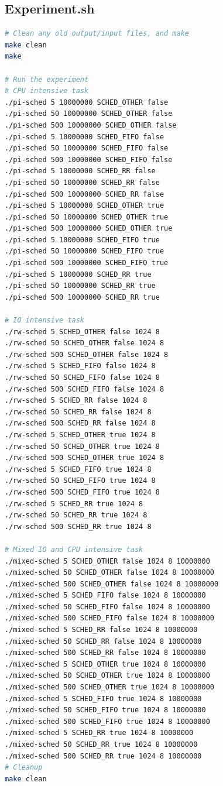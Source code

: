 \documentclass{article}
\begin{document}
\subsection{Experiment.sh}
\begin{lstlisting}[language=bash]
# Clean any old output/input files, and make
make clean
make

# Run the experiment
# CPU intensive task
./pi-sched 5 10000000 SCHED_OTHER false
./pi-sched 50 10000000 SCHED_OTHER false
./pi-sched 500 10000000 SCHED_OTHER false
./pi-sched 5 10000000 SCHED_FIFO false
./pi-sched 50 10000000 SCHED_FIFO false
./pi-sched 500 10000000 SCHED_FIFO false
./pi-sched 5 10000000 SCHED_RR false
./pi-sched 50 10000000 SCHED_RR false
./pi-sched 500 10000000 SCHED_RR false
./pi-sched 5 10000000 SCHED_OTHER true
./pi-sched 50 10000000 SCHED_OTHER true
./pi-sched 500 10000000 SCHED_OTHER true
./pi-sched 5 10000000 SCHED_FIFO true
./pi-sched 50 10000000 SCHED_FIFO true
./pi-sched 500 10000000 SCHED_FIFO true
./pi-sched 5 10000000 SCHED_RR true
./pi-sched 50 10000000 SCHED_RR true
./pi-sched 500 10000000 SCHED_RR true

# IO intensive task
./rw-sched 5 SCHED_OTHER false 1024 8
./rw-sched 50 SCHED_OTHER false 1024 8
./rw-sched 500 SCHED_OTHER false 1024 8
./rw-sched 5 SCHED_FIFO false 1024 8
./rw-sched 50 SCHED_FIFO false 1024 8
./rw-sched 500 SCHED_FIFO false 1024 8
./rw-sched 5 SCHED_RR false 1024 8
./rw-sched 50 SCHED_RR false 1024 8
./rw-sched 500 SCHED_RR false 1024 8
./rw-sched 5 SCHED_OTHER true 1024 8
./rw-sched 50 SCHED_OTHER true 1024 8
./rw-sched 500 SCHED_OTHER true 1024 8
./rw-sched 5 SCHED_FIFO true 1024 8
./rw-sched 50 SCHED_FIFO true 1024 8
./rw-sched 500 SCHED_FIFO true 1024 8
./rw-sched 5 SCHED_RR true 1024 8
./rw-sched 50 SCHED_RR true 1024 8
./rw-sched 500 SCHED_RR true 1024 8

# Mixed IO and CPU intensive task
./mixed-sched 5 SCHED_OTHER false 1024 8 10000000
./mixed-sched 50 SCHED_OTHER false 1024 8 10000000
./mixed-sched 500 SCHED_OTHER false 1024 8 10000000
./mixed-sched 5 SCHED_FIFO false 1024 8 10000000
./mixed-sched 50 SCHED_FIFO false 1024 8 10000000
./mixed-sched 500 SCHED_FIFO false 1024 8 10000000
./mixed-sched 5 SCHED_RR false 1024 8 10000000
./mixed-sched 50 SCHED_RR false 1024 8 10000000
./mixed-sched 500 SCHED_RR false 1024 8 10000000
./mixed-sched 5 SCHED_OTHER true 1024 8 10000000
./mixed-sched 50 SCHED_OTHER true 1024 8 10000000
./mixed-sched 500 SCHED_OTHER true 1024 8 10000000
./mixed-sched 5 SCHED_FIFO true 1024 8 10000000
./mixed-sched 50 SCHED_FIFO true 1024 8 10000000
./mixed-sched 500 SCHED_FIFO true 1024 8 10000000
./mixed-sched 5 SCHED_RR true 1024 8 10000000
./mixed-sched 50 SCHED_RR true 1024 8 10000000
./mixed-sched 500 SCHED_RR true 1024 8 10000000
# Cleanup
make clean

\end{lstlisting}
\end{document}
